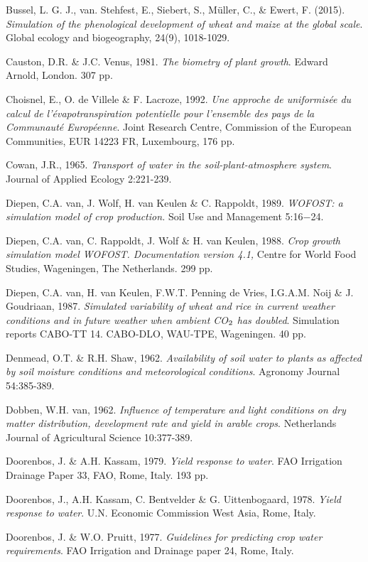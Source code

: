 Bussel, L. G. J., van. Stehfest, E., Siebert, S., Müller, C., \& Ewert, F. (2015). {\it Simulation of 
the phenological development of wheat and maize at the global scale}. Global ecology and biogeography, 
24(9), 1018-1029.

Causton, D.R. \& J.C. Venus, 1981. {\it The biometry of plant growth\/}. Edward Arnold, London.
307 pp.

Choisnel, E., O. de Villele \& F. Lacroze, 1992. {\it Une approche de uniformis\'{e}e du calcul de
l'\'{e}vapotranspiration potentielle pour l'ensemble des pays de la Communaut\'{e} Europ\'{e}enne\/}.
Joint Research Centre, Commission of the European Communities, EUR 14223 FR,
Luxembourg, 176 pp.

Cowan, J.R., 1965. {\it Transport of water in the soil-plant-atmosphere system\/}. Journal of
Applied Ecology 2:221-239.

Diepen, C.A. van, J. Wolf, H. van Keulen \& C. Rappoldt, 1989. {\it WOFOST: a simulation
model of crop production.\/} Soil Use and Management 5:16$-$24. 

Diepen, C.A. van, C. Rappoldt, J. Wolf \& H. van Keulen, 1988. {\it Crop growth simulation
model WOFOST. Documentation version 4.1,\/} Centre for World Food Studies, Wageningen,
The Netherlands. 299 pp. 

Diepen, C.A. van, H. van Keulen, F.W.T. Penning de Vries, I.G.A.M. Noij \& J.
Goudriaan, 1987. {\it Simulated variabil\-ity of wheat and rice in current weather conditions and
in future weather when ambient CO$_{{\rm 2}}$ has doubled\/}. Simulation reports CABO-TT 14. CABO-DLO, WAU-TPE, Wageningen. 40 pp.

Denmead, O.T. \& R.H. Shaw, 1962. {\it Availability of soil water to plants as affected by soil
moisture conditions and meteorological conditions\/}. Agronomy Journal 54:385-389.

Dobben, W.H. van, 1962. {\it Influence of temperature and light conditions on dry matter
distribution, development rate and yield in arable crops\/}. Netherlands Journal of Agricultural
Science 10:377-389.

Doorenbos, J. \& A.H. Kassam, 1979. {\it Yield response to water\/}. FAO Irrigation Drainage
Paper 33, FAO, Rome, Italy. 193 pp.

Doorenbos, J., A.H. Kassam, C. Bentvelder \& G. Uittenbogaard, 1978. {\it Yield response to
water\/}. U.N. Economic Commission West Asia, Rome, Italy.

Doorenbos, J. \& W.O. Pruitt, 1977. {\it Guidelines for predicting crop water requirements\/}.
FAO Irrigation and Drainage paper 24, Rome, Italy.

